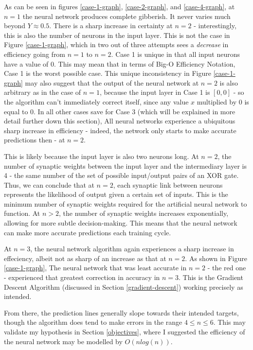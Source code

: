 \documentclass[12pt]{article}
\begin{document}
As can be seen in figures \ref{case-1-graph}, \ref{case-2-graph}, and \ref{case-4-graph}, at $n = 1$ the neural network produces complete gibberish. It never varies much beyond $Y \approx 0.5$. There is a sharp increase in certainty at $n = 2$ - interestingly, this is also the number of neurons in the input layer. This is not the case in Figure \ref{case-1-graph}, which in two out of three attempts sees a \textit{decrease} in efficiency going from $n = 1$ to $n = 2$. Case 1 is unique in that all input neurons have a value of 0. This may mean that in terms of Big-O Efficiency Notation, Case 1 is the worst possible case. This unique inconsistency in Figure \ref{case-1-graph} may also suggest that the output of the neural network at $n = 2$ is also arbitrary as in the case of $n = 1$, because the input layer in Case 1 is $[0, 0]$ - so the algorithm can't immediately correct itself, since any value $x$ multiplied by $0$ is equal to 0. In all other cases save for Case 3 (which will be explained in more detail further down this section), All neural networks experience a ubiquitous sharp increase in efficiency - indeed, the network only starts to make accurate predictions then - at $n = 2$.

This is likely because the input layer is also two neurons long. At $n = 2$, the number of synaptic weights between the input layer and the intermediary layer is 4 - the same number of the set of possible input/output pairs of an XOR gate. Thus, we can conclude that at $n = 2$, each synaptic link between neurons represents the likelihood of output given a certain set of inputs. This is the minimum number of synaptic weights required for the artificial neural network to function. At $n > 2$, the number of synaptic weights increases exponentially, allowing for more subtle decision-making. This means that the neural network can make more accurate predictions each training cycle.

At $n = 3$, the neural network algorithm again experiences a sharp increase in effeciency, albeit not as sharp of an increase as that at $n = 2$. As shown in Figure \ref{case-1-graph}, The neural network that was least accurate in $n = 2$ - the red one - experienced that greatest correction in accuracy in $n = 3$. This is the Gradient Descent Algorithm (discussed in Section \ref{gradient-descent}) working precisely as intended.

From there, the prediction lines generally slope towards their intended targets, though the algorithm does tend to make errors in the range $4 \leq n \leq 6$. This may validate my hypothesis in Section \ref{objectives}, where I suggested the efficiency of the neural network may be modelled by $O(n log(n))$.
\end{document}
